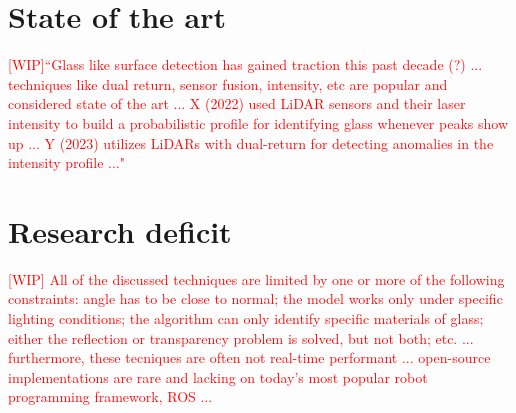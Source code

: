 

\section{State of the art}
\textcolor{red}{[WIP]``Glass like surface detection has gained traction this past decade (?) ... techniques like dual return, sensor fusion, intensity, etc are popular and considered state of the art ... X (2022) used LiDAR sensors and their laser intensity to build a probabilistic profile for identifying glass whenever peaks show up ... Y (2023) utilizes LiDARs with dual-return for detecting anomalies in the intensity profile ..."}






\section{Research deficit}
\textcolor{red}{[WIP] All of the discussed techniques are limited by one or more of the following constraints: angle has to be close to normal; the model works only under specific lighting conditions; the algorithm can only identify specific materials of glass; either the reflection or transparency problem is solved, but not both; etc. ... furthermore, these tecniques are often not real-time performant ... open-source implementations are rare and lacking on today's most popular robot programming framework, ROS ...}